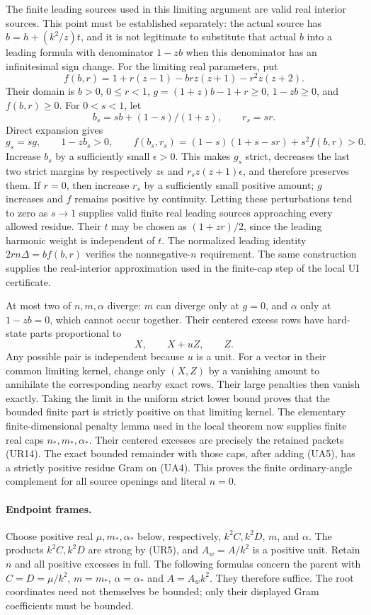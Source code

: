The finite leading sources used in this limiting argument are valid
real interior sources. This point must be established separately:
the actual source has $b=h+(k^2/z)t$, and it is not legitimate to
substitute that actual $b$ into a leading formula with denominator
$1-zb$ when this denominator has an infinitesimal sign change.
For the limiting real parameters, put
\[
 f(b,r)=1+r(z-1)-brz(z+1)-r^2z(z+2).
\]
Their domain is $b>0$, $0\le r<1$, $g=(1+z)b-1+r\ge0$,
$1-zb\ge0$, and $f(b,r)\ge0$. For $0<s<1$, let
\[
 b_s=sb+(1-s)/(1+z),\qquad r_s=sr.
\]
Direct expansion gives
\[
 g_s=sg,\qquad 1-zb_s>0,\qquad
 f(b_s,r_s)=(1-s)(1+s-sr)+s^2f(b,r)>0.
\]
Increase $b_s$ by a sufficiently small $\epsilon>0$. This makes
$g_s$ strict, decreases the last two strict margins by respectively
$z\epsilon$ and $r_sz(z+1)\epsilon$, and therefore preserves them.
If $r=0$, then increase $r_s$ by a sufficiently small positive
amount; $g$ increases and $f$ remains positive by continuity.
Letting these perturbations tend to zero as $s\to1$ supplies valid
finite real leading sources approaching every allowed residue.
Their $t$ may be chosen as $(1+zr)/2$, since the leading harmonic
weight is independent of $t$. The normalized leading identity
$2rn\Delta=bf(b,r)$ verifies the nonnegative-$n$ requirement.
The same construction supplies the real-interior approximation
used in the finite-cap step of the local UI certificate.

At most two of $n,m,\alpha$ diverge: $m$ can diverge only at $g=0$,
and $\alpha$ only at $1-zb=0$, which cannot occur together. Their
centered excess rows have hard-state parts proportional to
\[
 X,\qquad X+uZ,\qquad Z.
\]
Any possible pair is independent because $u$ is a unit. For a vector
in their common limiting kernel, change only $(X,Z)$ by a vanishing
amount to annihilate the corresponding nearby exact rows. Their
large penalties then vanish exactly. Taking the limit in the uniform
strict lower bound proves that the bounded finite part is strictly
positive on that limiting kernel. The elementary finite-dimensional
penalty lemma used in the local theorem now supplies finite real caps
$n_*,m_*,\alpha_*$. Their centered excesses are precisely the retained
packets (UR14). The exact bounded remainder with those caps, after
adding (UA5), has a strictly positive residue Gram on (UA4).
This proves the finite ordinary-angle complement for all source
openings and literal $n=0$.

\paragraph{Endpoint frames.}
Choose positive real $\mu,m_*,\alpha_*$ below, respectively,
$k^2C,k^2D$, $m$, and $\alpha$. The products $k^2C,k^2D$ are strong
by (UR5), and $A_w=A/k^2$ is a positive unit. Retain $n$ and all
positive excesses in full. The following formulas concern the parent
with $C=D=\mu/k^2$, $m=m_*$, $\alpha=\alpha_*$ and $A=A_wk^2$.
They therefore suffice. The root coordinates need not themselves be
bounded; only their displayed Gram coefficients must be bounded.

